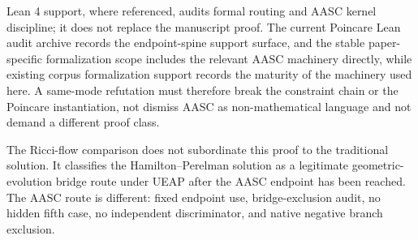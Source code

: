 \documentclass[11pt]{article}
\begin{document}
Lean 4 support, where referenced, audits formal routing and AASC kernel discipline; it does not replace the manuscript proof. The current Poincare Lean audit archive records the endpoint-spine support surface, and the stable paper-specific formalization scope includes the relevant AASC machinery directly, while existing corpus formalization support records the maturity of the machinery used here. A same-mode refutation must therefore break the constraint chain or the Poincare instantiation, not dismiss AASC as non-mathematical language and not demand a different proof class.

The Ricci-flow comparison does not subordinate this proof to the traditional solution. It classifies the Hamilton--Perelman solution as a legitimate geometric-evolution bridge route under UEAP after the AASC endpoint has been reached. The AASC route is different: fixed endpoint use, bridge-exclusion audit, no hidden fifth case, no independent discriminator, and native negative branch exclusion.

\appendix
\end{document}
